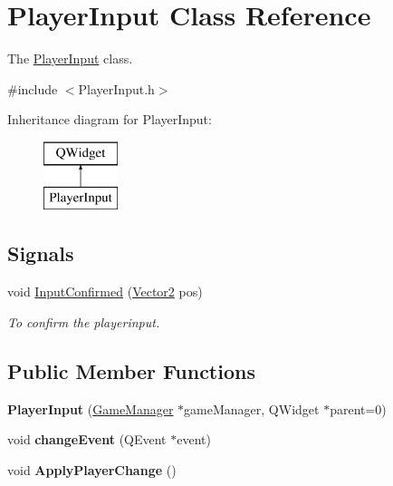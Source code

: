 \hypertarget{classPlayerInput}{\section{Player\-Input Class Reference}
\label{classPlayerInput}
}


The \hyperlink{classPlayerInput}{Player\-Input} class.  




{\ttfamily \#include $<$Player\-Input.\-h$>$}

Inheritance diagram for Player\-Input\-:\begin{figure}[H]
\begin{center}
\leavevmode
\includegraphics[height=2.000000cm]{classPlayerInput}
\end{center}
\end{figure}
\subsection*{Signals}
\begin{DoxyCompactItemize}
\item 
void \hyperlink{classPlayerInput_aab7de51daaa958792ffaae64e41f43e6}{Input\-Confirmed} (\hyperlink{structVector2}{Vector2} pos)
\begin{DoxyCompactList}\small\item\em To confirm the playerinput. \end{DoxyCompactList}\end{DoxyCompactItemize}
\subsection*{Public Member Functions}
\begin{DoxyCompactItemize}
\item 
\hypertarget{classPlayerInput_a41adeb104eebbd46404b0a29203441c5}{{\bfseries Player\-Input} (\hyperlink{classGameManager}{Game\-Manager} $\ast$game\-Manager, Q\-Widget $\ast$parent=0)}\label{classPlayerInput_a41adeb104eebbd46404b0a29203441c5}

\item 
\hypertarget{classPlayerInput_ab8abc1017f5b0e8589fbf1b8b550eba4}{void {\bfseries change\-Event} (Q\-Event $\ast$event)}\label{classPlayerInput_ab8abc1017f5b0e8589fbf1b8b550eba4}

\item 
\hypertarget{classPlayerInput_a2135e14f7e216f1f78ab63212230aa03}{void {\bfseries Apply\-Player\-Change} ()}\label{classPlayerInput_a2135e14f7e216f1f78ab63212230aa03}

\end{DoxyCompactItemize}


